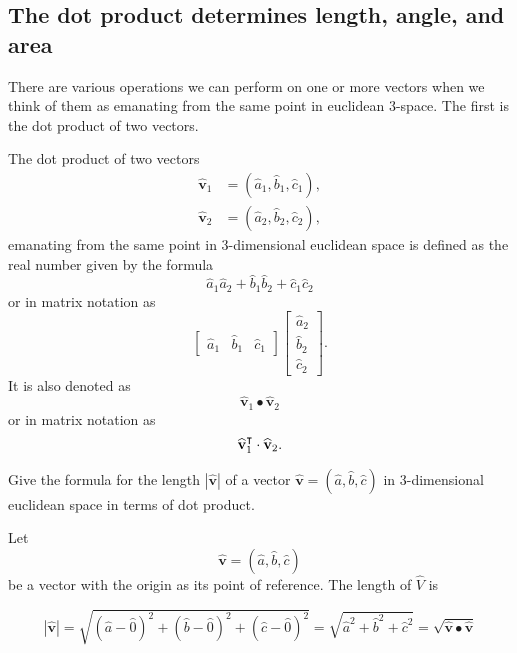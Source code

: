 \documentclass[newpage,hints,handout,nooutcomes,noauthor,12pt]{ximera}
\begin{document}
\subsection{The dot product determines length, angle, and area}

There are various operations we can perform on one or more vectors when we
think of them as emanating from the same point in euclidean $3$-space. The
first is the dot product of two vectors.

\begin{definition}
The dot product of two vectors%
\begin{align*}
\hat{\mathbf v}_{1}  &  =(\hat{a}_{1},\hat{b}_{1},\hat{c}_{1}), \\
\hat{\mathbf v}_{2}  &  =(\hat{a}_{2},\hat{b}_{2},\hat{c}_{2}),
\end{align*}
emanating from the same point in 3-dimensional euclidean space is
defined as the real number given by the formula%
\[
\hat{a}_{1}\hat{a}_{2}+\hat{b}_{1}\hat{b}_{2}+\hat{c}_{1}\hat{c}_{2}%
\]
or in matrix notation as%
\[
\begin{bmatrix}
\hat{a}_{1} & \hat{b}_{1} & \hat{c}_{1}%
\end{bmatrix}
\begin{bmatrix}
\hat{a}_{2}\\
\hat{b}_{2}\\
\hat{c}_{2}%
\end{bmatrix}.
\]
It is also denoted as%
\[
\hat{\mathbf v}_{1}\bullet\hat{\mathbf v}_{2}%
\]
or in matrix notation as%
\[
\widehat{\mathbf v}_{1}^\intercal\cdot \widehat{\mathbf v}_{2}.
\]

\end{definition}

\begin{problem}
  Give the formula for the length $\left\vert \hat{\mathbf v}\right\vert $ of a
  vector $\hat{\mathbf v}=(\hat{a},\hat{b},\hat{c})$ in 3-dimensional
  euclidean space in terms of dot product.

\begin{onlineOnly}
\end{onlineOnly}

\begin{freeResponse}
Let 
\[
\hat{\mathbf v}=\left(  \hat{a},\hat{b},\hat{c}\right)
\]
be a vector with the origin as its point of reference. The length of $\hat{V}$ is

\[
\left\vert \hat{\mathbf v}\right\vert=\sqrt{(\hat{a}-\hat{0})^{2}+
  (\hat{b}-\hat{0})^{2}+(\hat{c}-\hat{0})^{2}} \label{0}
= \sqrt{\hat{a}^2+\hat{b}^2+\hat{c}^2}=\sqrt{\hat{\mathbf v}\bullet\hat{\mathbf v}}
\]
\end{freeResponse}
\end{problem}
\end{document}

